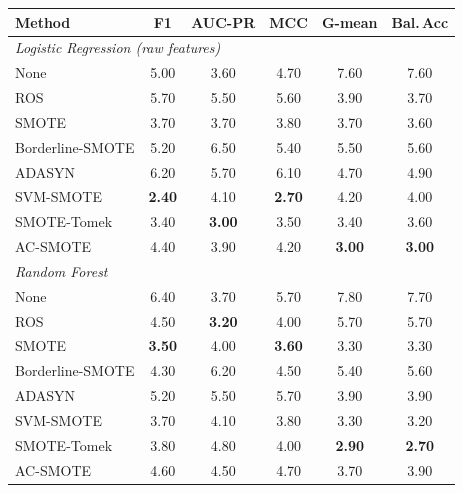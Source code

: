 \begin{minipage}[t]{0.49\textwidth}\centering
\begin{tabular}{@{}lccccc@{}}
\toprule
Method & F1 & AUC-PR & MCC & G-mean & Bal.\,Acc \\
\midrule
\multicolumn{6}{l}{\textit{Logistic Regression (raw features)}}\\
None & 5.00 & 3.60 & 4.70 & 7.60 & 7.60 \\
ROS & 5.70 & 5.50 & 5.60 & 3.90 & 3.70 \\
SMOTE & 3.70 & 3.70 & 3.80 & 3.70 & 3.60 \\
Borderline-SMOTE & 5.20 & 6.50 & 5.40 & 5.50 & 5.60 \\
ADASYN & 6.20 & 5.70 & 6.10 & 4.70 & 4.90 \\
SVM-SMOTE & \textbf{2.40} & 4.10 & \textbf{2.70} & 4.20 & 4.00 \\
SMOTE-Tomek & 3.40 & \textbf{3.00} & 3.50 & 3.40 & 3.60 \\
AC-SMOTE & 4.40 & 3.90 & 4.20 & \textbf{3.00} & \textbf{3.00} \\
\midrule
\multicolumn{6}{l}{\textit{Random Forest}}\\
None & 6.40 & 3.70 & 5.70 & 7.80 & 7.70 \\
ROS & 4.50 & \textbf{3.20} & 4.00 & 5.70 & 5.70 \\
SMOTE & \textbf{3.50} & 4.00 & \textbf{3.60} & 3.30 & 3.30 \\
Borderline-SMOTE & 4.30 & 6.20 & 4.50 & 5.40 & 5.60 \\
ADASYN & 5.20 & 5.50 & 5.70 & 3.90 & 3.90 \\
SVM-SMOTE & 3.70 & 4.10 & 3.80 & 3.30 & 3.20 \\
SMOTE-Tomek & 3.80 & 4.80 & 4.00 & \textbf{2.90} & \textbf{2.70} \\
AC-SMOTE & 4.60 & 4.50 & 4.70 & 3.70 & 3.90 \\
\bottomrule
\end{tabular}
\end{minipage}\hfill
